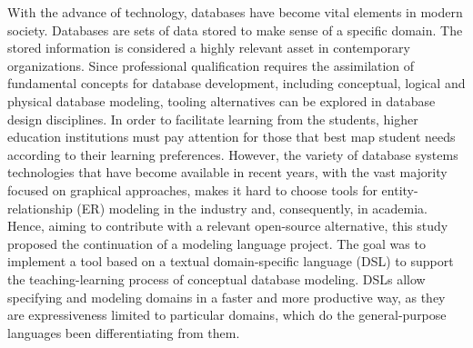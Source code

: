 \begin{resumo}[Abstract]
With the advance of technology, databases have become vital elements in modern society.
Databases are sets of data stored to make sense of a specific domain.
The stored information is considered a highly relevant asset in contemporary organizations.
Since professional qualification requires the assimilation of fundamental concepts for database development, including conceptual, logical and physical database modeling, tooling alternatives can be explored in database design disciplines. 
In order to facilitate learning from the students, higher education institutions must pay attention for those that best map student needs according to their learning preferences.
However, the variety of database systems technologies that have become available in recent years, with the vast majority focused on graphical approaches, makes it hard to choose tools for entity-relationship (ER) modeling in the industry and, consequently, in academia.
Hence, aiming to contribute with a relevant open-source alternative, this study proposed the continuation of a modeling language project.
The goal was to implement a tool based on a textual domain-specific language (DSL) to support the teaching-learning process of conceptual database modeling.
DSLs allow specifying and modeling domains in a faster and more productive way, as they are expressiveness limited to particular domains, which do the general-purpose languages been differentiating from them.

\end{resumo}
